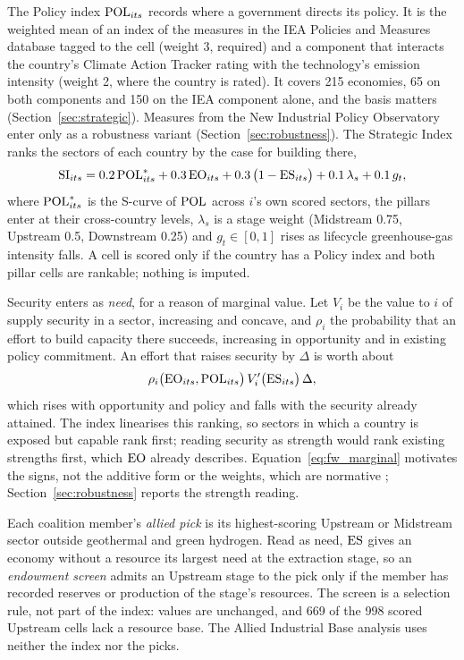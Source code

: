 The Policy index $\mathrm{POL}_{its}$ records where a government directs its policy. It is the weighted
mean of an index of the measures in the IEA Policies and Measures database tagged to the cell
(weight 3, required) and a component that interacts the country's Climate Action Tracker rating
with the technology's emission intensity (weight 2, where the country is rated). It covers 215
economies, 65 on both components and 150 on the IEA component alone, and the basis matters
(Section~\ref{sec:strategic}). Measures from the New Industrial Policy Observatory enter only as a
robustness variant (Section~\ref{sec:robustness}). The Strategic Index ranks the sectors of each
country by the case for building there,
\begin{equation}\label{eq:fw_si}
  \mathrm{SI}_{its}=0.2\,\mathrm{POL}^{*}_{its}+0.3\,\mathrm{EO}_{its}+0.3\,\bigl(1-\mathrm{ES}_{its}\bigr)
  +0.1\,\lambda_s+0.1\,g_t ,
\end{equation}
where $\mathrm{POL}^{*}_{its}$ is the S-curve of $\mathrm{POL}$ across $i$'s own scored sectors, the pillars enter
at their cross-country levels, $\lambda_s$ is a stage weight (Midstream 0.75, Upstream 0.5,
Downstream 0.25) and $g_t\in[0,1]$ rises as lifecycle greenhouse-gas intensity falls. A cell is
scored only if the country has a Policy index and both pillar cells are rankable; nothing is
imputed.

Security enters as \emph{need}, for a reason of marginal value. Let $V_i$ be the value to $i$ of
supply security in a sector, increasing and concave, and $\rho_i$ the probability that an effort
to build capacity there succeeds, increasing in opportunity and in existing policy commitment. An
effort that raises security by $\Delta$ is worth about
\begin{equation}\label{eq:fw_marginal}
  \rho_i\bigl(\mathrm{EO}_{its},\mathrm{POL}_{its}\bigr)\,V_i'\bigl(\mathrm{ES}_{its}\bigr)\,\Delta ,
\end{equation}
which rises with opportunity and policy and falls with the security already attained. The index
linearises this ranking, so sectors in which a country is exposed but capable rank first; reading
security as strength would rank existing strengths first, which $\mathrm{EO}$ already describes.
Equation~\eqref{eq:fw_marginal} motivates the signs, not the additive form or the weights, which
are normative \citep{decancq2013weights}; Section~\ref{sec:robustness} reports the strength
reading.

Each coalition member's \emph{allied pick} is its highest-scoring Upstream or Midstream sector
outside geothermal and green hydrogen. Read as need, $\mathrm{ES}$ gives an economy without a resource
its largest need at the extraction stage, so an \emph{endowment screen} admits an Upstream stage
to the pick only if the member has recorded reserves or production of the stage's resources. The
screen is a selection rule, not part of the index: values are unchanged, and 669 of the 998 scored
Upstream cells lack a resource base. The Allied Industrial Base analysis uses neither the index
nor the picks.

